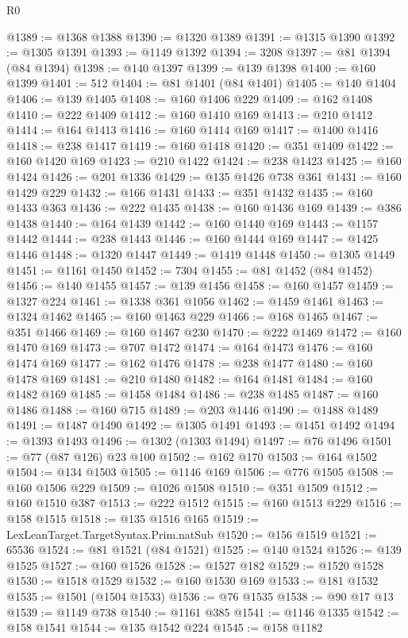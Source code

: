 \begin{lexlean}{R0}
\begin{coremodule}
@1389 := @1368 @1388
@1390 := @1320 @1389
@1391 := @1315 @1390
@1392 := @1305 @1391
@1393 := @1149 @1392
@1394 := 3208
@1397 := @81 @1394 (@84 @1394)
@1398 := @140 @1397
@1399 := @139 @1398
@1400 := @160 @1399
@1401 := 512
@1404 := @81 @1401 (@84 @1401)
@1405 := @140 @1404
@1406 := @139 @1405
@1408 := @160 @1406 @229
@1409 := @162 @1408
@1410 := @222 @1409
@1412 := @160 @1410 @169
@1413 := @210 @1412
@1414 := @164 @1413
@1416 := @160 @1414 @169
@1417 := @1400 @1416
@1418 := @238 @1417
@1419 := @160 @1418
@1420 := @351 @1409
@1422 := @160 @1420 @169
@1423 := @210 @1422
@1424 := @238 @1423
@1425 := @160 @1424
@1426 := @201 @1336
@1429 := @135 @1426 @738 @361
@1431 := @160 @1429 @229
@1432 := @166 @1431
@1433 := @351 @1432
@1435 := @160 @1433 @363
@1436 := @222 @1435
@1438 := @160 @1436 @169
@1439 := @386 @1438
@1440 := @164 @1439
@1442 := @160 @1440 @169
@1443 := @1157 @1442
@1444 := @238 @1443
@1446 := @160 @1444 @169
@1447 := @1425 @1446
@1448 := @1320 @1447
@1449 := @1419 @1448
@1450 := @1305 @1449
@1451 := @1161 @1450
@1452 := 7304
@1455 := @81 @1452 (@84 @1452)
@1456 := @140 @1455
@1457 := @139 @1456
@1458 := @160 @1457
@1459 := @1327 @224
@1461 := @1338 @361 @1056
@1462 := @1459 @1461
@1463 := @1324 @1462
@1465 := @160 @1463 @229
@1466 := @168 @1465
@1467 := @351 @1466
@1469 := @160 @1467 @230
@1470 := @222 @1469
@1472 := @160 @1470 @169
@1473 := @707 @1472
@1474 := @164 @1473
@1476 := @160 @1474 @169
@1477 := @162 @1476
@1478 := @238 @1477
@1480 := @160 @1478 @169
@1481 := @210 @1480
@1482 := @164 @1481
@1484 := @160 @1482 @169
@1485 := @1458 @1484
@1486 := @238 @1485
@1487 := @160 @1486
@1488 := @160 @715
@1489 := @203 @1446
@1490 := @1488 @1489
@1491 := @1487 @1490
@1492 := @1305 @1491
@1493 := @1451 @1492
@1494 := @1393 @1493
@1496 := @1302 (@1303 @1494)
@1497 := @76 @1496
@1501 := @77 (@87 @126) @23 @100
@1502 := @162 @170
@1503 := @164 @1502
@1504 := @134 @1503
@1505 := @1146 @169
@1506 := @776 @1505
@1508 := @160 @1506 @229
@1509 := @1026 @1508
@1510 := @351 @1509
@1512 := @160 @1510 @387
@1513 := @222 @1512
@1515 := @160 @1513 @229
@1516 := @158 @1515
@1518 := @135 @1516 @165
@1519 := LexLeanTarget.TargetSyntax.Prim.natSub
@1520 := @156 @1519
@1521 := 65536
@1524 := @81 @1521 (@84 @1521)
@1525 := @140 @1524
@1526 := @139 @1525
@1527 := @160 @1526
@1528 := @1527 @182
@1529 := @1520 @1528
@1530 := @1518 @1529
@1532 := @160 @1530 @169
@1533 := @181 @1532
@1535 := @1501 (@1504 @1533)
@1536 := @76 @1535
@1538 := @90 @17 @13
@1539 := @1149 @738
@1540 := @1161 @385
@1541 := @1146 @1335
@1542 := @158 @1541
@1544 := @135 @1542 @224
@1545 := @158 @1182

\end{coremodule}
\end{lexlean}
